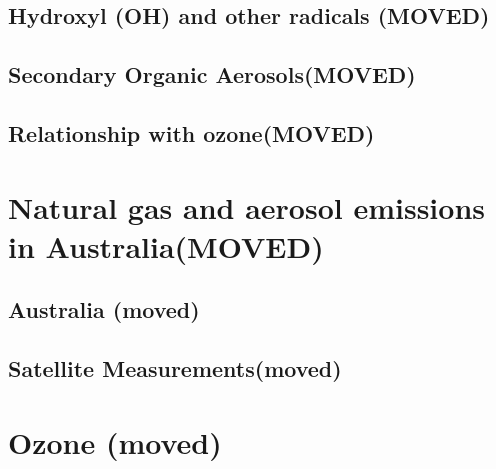   \subsection{Hydroxyl (OH) and other radicals (MOVED)}
    \label{ch_LitRev:sec:RadicalFormation}
  \subsection{Secondary Organic Aerosols(MOVED)}
  \subsection{Relationship with ozone(MOVED)}
\section{Natural gas and aerosol emissions in Australia(MOVED)}
\label{ch_LitRev:sec:emissions}
  \subsection{Australia (moved)}
  \subsection{Satellite Measurements(moved)}
    
\section{Ozone (moved)}
\label{ch_LitRev:sec:Ozone}

